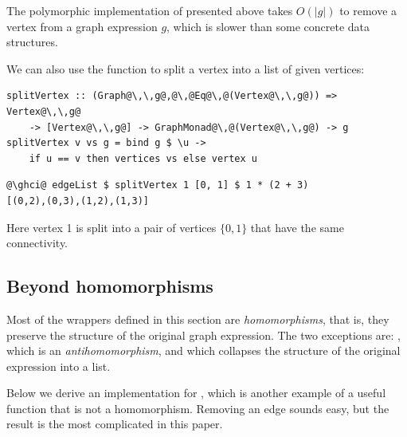 The polymorphic implementation of  presented above takes
$O(|g|)$ to remove a vertex from a graph expression $g$, which is
slower than some concrete data structures.

We can also use the  function to split a vertex into a list of given vertices:

\begin{verbatim}
splitVertex :: (Graph@\,\,g@,@\,@Eq@\,@(Vertex@\,\,g@)) => Vertex@\,\,g@
    -> [Vertex@\,\,g@] -> GraphMonad@\,@(Vertex@\,\,g@) -> g
splitVertex v vs g = bind g $ \u ->
    if u == v then vertices vs else vertex u
\end{verbatim}
\vspace{1mm}
\begin{verbatim}
@\ghci@ edgeList $ splitVertex 1 [0, 1] $ 1 * (2 + 3)
[(0,2),(0,3),(1,2),(1,3)]
\end{verbatim}

\noindent
Here vertex 1 is split into a pair of vertices $\{0, 1\}$ that have the same connectivity.

\subsection{Beyond homomorphisms}\label{sub-beyond}

Most of the  wrappers defined in this section are \emph{homomorphisms},
that is, they preserve the structure of the original graph expression. The two
exceptions are: , which is an \emph{antihomomorphism}, and
 which collapses the structure of the original expression into a list.

Below we derive an implementation for , which is another
example of a useful function that is not a homomorphism. Removing an edge sounds
easy, but the result is the most complicated  in this paper.

